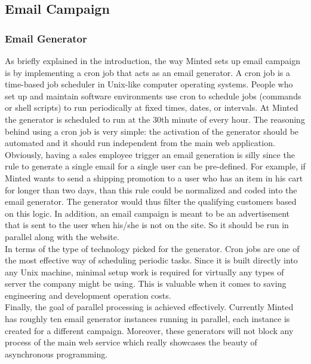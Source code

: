 \documentclass[12pt]{article}
\begin{document}
\subsection{Email Campaign}

\subsubsection{Email Generator}
As briefly explained in the introduction, the way Minted sets up email campaign is by implementing a cron job that acts as an email generator. A cron job is a time-based job scheduler in Unix-like computer operating systems. People who set up and maintain software environments use cron to schedule jobs (commands or shell scripts) to run periodically at fixed times, dates, or intervals.\cite{cron} At Minted the generator is scheduled to run at the 30th minute of every hour. The reasoning behind using a cron job is very simple: the activation of the generator should be automated and it should run independent from the main web application. Obviously, having a sales employee trigger an email generation is silly since the rule to generate a single email for a single user can be pre-defined. For example, if Minted wants to send a shipping promotion to a user who has an item in his cart for longer than two days, than this rule could be normalized and coded into the email generator. The generator would thus filter the qualifying customers based on this logic. In addition, an email campaign is meant to be an advertisement that is sent to the user when his/she is not on the site. So it should be run in parallel along with the website.\\

In terms of the type of technology picked for the generator. Cron jobs are one of the most effective way of scheduling periodic tasks. Since it is built directly into any Unix machine, minimal setup work is required for virtually any types of server the company might be using. This is valuable when it comes to saving engineering and development operation costs.\\

Finally, the goal of parallel processing is achieved effectively. Currently Minted has roughly ten email generator instances running in parallel, each instance is created for a different campaign. Moreover, these generators will not block any process of the main web service which really showcases the beauty of asynchronous programming.\\
\end{document}
